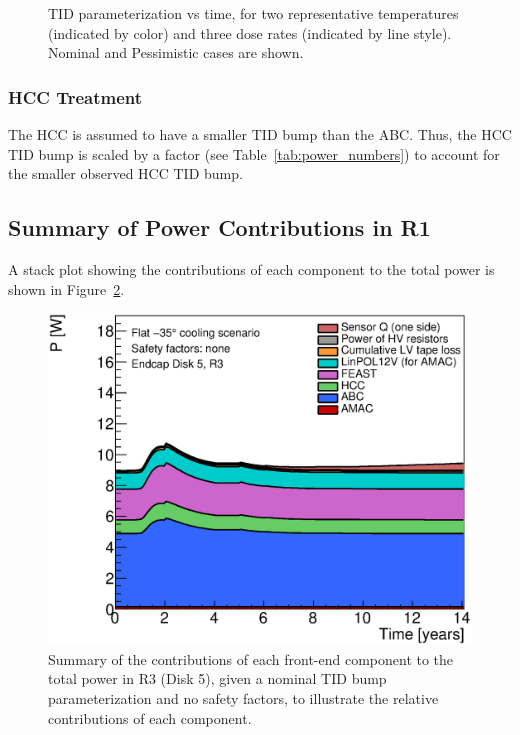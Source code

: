 \begin{figure}[ht!]
\begin{center}
\end{center}
\caption{TID parameterization vs time, for two representative temperatures (indicated by
color) and three dose rates (indicated by line style). Nominal and Pessimistic cases are shown.}
\label{tid_parameterization}
\end{figure}

\subsubsection*{HCC Treatment}

The HCC is assumed to have a smaller TID bump than the ABC. Thus, the HCC TID bump
is scaled by a factor (see Table~\ref{tab:power_numbers}) to account for the smaller observed HCC TID bump.

\subsection{Summary of Power Contributions in R1}

A stack plot showing the contributions of each component to the total power is shown in
Figure~\ref{power_stackplot}.

\begin{figure}[ht!]
\begin{center}
\includegraphics[width=0.55\linewidth]{figures/PowerStackPlot.eps}
\end{center}
\caption{Summary of the contributions of each front-end component to the total power in R3 (Disk 5), given
a nominal TID bump parameterization and no safety factors, to illustrate the relative contributions
of each component.}
\label{power_stackplot}
\end{figure}

